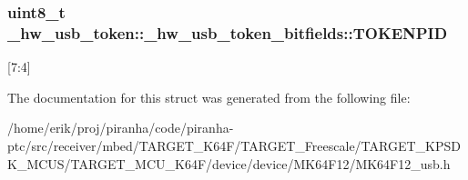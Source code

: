 \subsubsection[{\texorpdfstring{T\+O\+K\+E\+N\+P\+ID}{TOKENPID}}]{\setlength{\rightskip}{0pt plus 5cm}uint8\+\_\+t \+\_\+hw\+\_\+usb\+\_\+token\+::\+\_\+hw\+\_\+usb\+\_\+token\+\_\+bitfields\+::\+T\+O\+K\+E\+N\+P\+ID}\hypertarget{struct__hw__usb__token_1_1__hw__usb__token__bitfields_aa80cc7984054440b91d65ea81f3a3ac1}{}\label{struct__hw__usb__token_1_1__hw__usb__token__bitfields_aa80cc7984054440b91d65ea81f3a3ac1}
\mbox{[}7\+:4\mbox{]} 

The documentation for this struct was generated from the following file\+:\begin{DoxyCompactItemize}
\item 
/home/erik/proj/piranha/code/piranha-\/ptc/src/receiver/mbed/\+T\+A\+R\+G\+E\+T\+\_\+\+K64\+F/\+T\+A\+R\+G\+E\+T\+\_\+\+Freescale/\+T\+A\+R\+G\+E\+T\+\_\+\+K\+P\+S\+D\+K\+\_\+\+M\+C\+U\+S/\+T\+A\+R\+G\+E\+T\+\_\+\+M\+C\+U\+\_\+\+K64\+F/device/device/\+M\+K64\+F12/M\+K64\+F12\+\_\+usb.\+h\end{DoxyCompactItemize}
